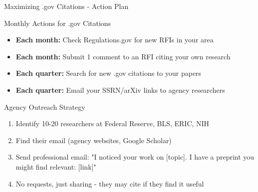 \documentclass[11pt]{beamer}
\begin{document}
	\begin{frame}{Maximizing .gov Citations - Action Plan}
		\scriptsize
		\begin{block}{Monthly Actions for .gov Citations}
			\begin{itemize}
				\item \textbf{Each month:} Check Regulations.gov for new RFIs in your area
				\item \textbf{Each month:} Submit 1 comment to an RFI citing your own research
				\item \textbf{Each quarter:} Search for new .gov citations to your papers
				\item \textbf{Each quarter:} Email your SSRN/arXiv links to agency researchers
			\end{itemize}
		\end{block}
		\begin{block}{Agency Outreach Strategy}
			\begin{enumerate}
				\item Identify 10-20 researchers at Federal Reserve, BLS, ERIC, NIH
				\item Find their email (agency websites, Google Scholar)
				\item Send professional email: "I noticed your work on [topic]. I have a preprint you might find relevant: [link]"
				\item No requests, just sharing - they may cite if they find it useful
			\end{enumerate}
		\end{block}
	\end{frame}
	
\end{document}
